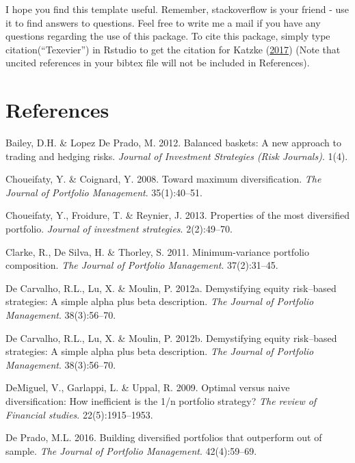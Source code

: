 \documentclass[11pt,preprint, authoryear]{elsarticle}
\numberwithin{equation}{section}
\numberwithin{figure}{section}
\numberwithin{table}{section}
\begin{document}
I hope you find this template useful. Remember, stackoverflow is your
friend - use it to find answers to questions. Feel free to write me a
mail if you have any questions regarding the use of this package. To
cite this package, simply type citation(``Texevier'') in Rstudio to get
the citation for Katzke (\protect\hyperlink{ref-Texevier}{2017}) (Note
that uncited references in your bibtex file will not be included in
References).

\newpage

\hypertarget{references}{%
\section*{References}\label{references}}

\hypertarget{refs}{}
\leavevmode\hypertarget{ref-lopez2012}{}%
Bailey, D.H. \& Lopez De Prado, M. 2012. Balanced baskets: A new
approach to trading and hedging risks. \emph{Journal of Investment
Strategies (Risk Journals)}. 1(4).

\leavevmode\hypertarget{ref-choueifaty2008}{}%
Choueifaty, Y. \& Coignard, Y. 2008. Toward maximum diversification.
\emph{The Journal of Portfolio Management}. 35(1):40--51.

\leavevmode\hypertarget{ref-choueifaty2013}{}%
Choueifaty, Y., Froidure, T. \& Reynier, J. 2013. Properties of the most
diversified portfolio. \emph{Journal of investment strategies}.
2(2):49--70.

\leavevmode\hypertarget{ref-clarke2011}{}%
Clarke, R., De Silva, H. \& Thorley, S. 2011. Minimum-variance portfolio
composition. \emph{The Journal of Portfolio Management}. 37(2):31--45.

\leavevmode\hypertarget{ref-rawl2012}{}%
De Carvalho, R.L., Lu, X. \& Moulin, P. 2012a. Demystifying equity
risk--based strategies: A simple alpha plus beta description. \emph{The
Journal of Portfolio Management}. 38(3):56--70.

\leavevmode\hypertarget{ref-leote}{}%
De Carvalho, R.L., Lu, X. \& Moulin, P. 2012b. Demystifying equity
risk--based strategies: A simple alpha plus beta description. \emph{The
Journal of Portfolio Management}. 38(3):56--70.

\leavevmode\hypertarget{ref-demiguel2009}{}%
DeMiguel, V., Garlappi, L. \& Uppal, R. 2009. Optimal versus naive
diversification: How inefficient is the 1/n portfolio strategy?
\emph{The review of Financial studies}. 22(5):1915--1953.

\leavevmode\hypertarget{ref-lopez}{}%
De Prado, M.L. 2016. Building diversified portfolios that outperform out
of sample. \emph{The Journal of Portfolio Management}. 42(4):59--69.
\end{document}
